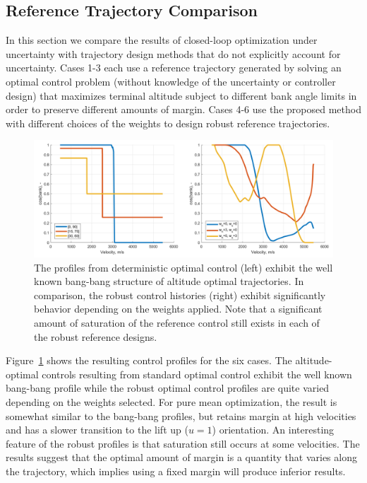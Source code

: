 \documentclass[journal ]{new-aiaa}
\begin{document}

\subsection*{Reference Trajectory Comparison}
In this section we compare the results of closed-loop optimization under uncertainty with trajectory design methods that do not explicitly account for uncertainty. Cases 1-3 each use a reference trajectory generated by solving an optimal control problem (without knowledge of the uncertainty or controller design) that maximizes terminal altitude subject to different bank angle limits in order to preserve different amounts of margin. Cases 4-6 use the proposed method with different choices of the weights to design robust reference trajectories.
\begin{figure}[h!]
	\centering
	\includegraphics[width=1\textwidth]{ddp/comparison_controls}
	\caption{The profiles from deterministic optimal control (left) exhibit the well known bang-bang structure of altitude optimal trajectories. In comparison, the robust control histories (right) exhibit significantly behavior depending on the weights applied. Note that a significant amount of saturation of the reference control still exists in each of the robust reference designs.}
	\label{fig_control_comparison}
\end{figure}
Figure~\ref{fig_control_comparison} shows the resulting control profiles for the six cases. The altitude-optimal controls resulting from standard optimal control exhibit the well known bang-bang profile while the robust optimal control profiles are quite varied depending on the weights selected. For pure mean optimization, the result is somewhat similar to the bang-bang profiles, but retains margin at high velocities and has a slower transition to the lift up ($u=1$) orientation. An interesting feature of the robust profiles is that saturation still occurs at some velocities. The results suggest that the optimal amount of margin is a quantity that varies along the trajectory, which implies using a fixed margin will produce inferior results.
\end{document}
